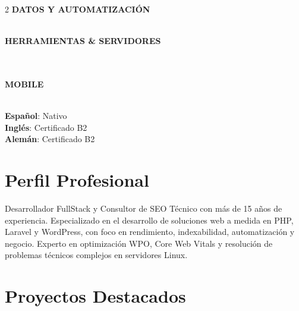 \documentclass[10pt,a4paper]{article}
\begin{document}
\begin{paracol}{2}
\vspace{0.4em}
\textbf{\color{primary}\footnotesize DATOS Y AUTOMATIZACIÓN} \\
  \\
 

\vspace{0.4em}
\textbf{\color{primary}\footnotesize HERRAMIENTAS \& SERVIDORES} \\
   \\
   \\
  

\vspace{0.4em}
\textbf{\color{primary}\footnotesize MOBILE} \\
   \\
 

\textbf{Español}: Nativo \\
\textbf{Inglés}: Certificado B2 \\
\textbf{Alemán}: Certificado B2

\switchcolumn


\section{Perfil Profesional}
Desarrollador FullStack y Consultor de SEO Técnico con más de 15 años de experiencia. Especializado en el desarrollo de soluciones web a medida en PHP, Laravel y WordPress, con foco en rendimiento, indexabilidad, automatización y negocio. Experto en optimización WPO, Core Web Vitals y resolución de problemas técnicos complejos en servidores Linux.

\section{Proyectos Destacados}



\end{paracol}
\end{document}

